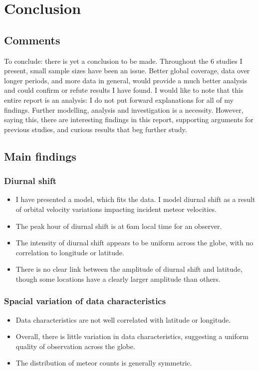 \chapter{Conclusion}
\section{Comments}
To conclude: there is yet a conclusion to be made. Throughout the 6 studies I present, small sample sizes have been an issue. Better global coverage, data over longer periods, and more data in general, would provide a much better analysis and could confirm or refute results I have found. I would like to note that this entire report is an analysis: I do not put forward explanations for all of my findings. Further modelling, analysis and investigation is a necessity. However, saying this, there are interesting findings in this report, supporting arguments for previous studies, and curious results that beg further study.
\section{Main findings}
\subsection{Diurnal shift}
\begin{itemize}
	\item I have presented a model, which fits the data. I model diurnal shift as a result of orbital velocity variations impacting incident meteor velocities.
	\item The peak hour of diurnal shift is at 6am local time for an observer.
	\item The intensity of diurnal shift appears to be uniform across the globe, with no correlation to longitude or latitude.
	\item There is no clear link between the amplitude of diurnal shift and latitude, though some locations have a clearly larger amplitude than others.
\end{itemize}
\subsection{Spacial variation of data characteristics}
\begin{itemize}
	\item Data characteristics are not well correlated with latitude or longitude.
	\item Overall, there is little variation in data characteristics, suggesting a uniform quality of observation across the globe.
	\item The distribution of meteor counts is generally symmetric.
\end{itemize}
